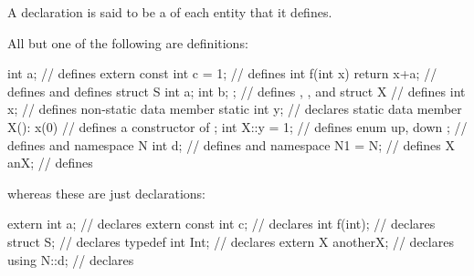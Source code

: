 A declaration is said to be a  of each entity that it defines.
\begin{example} All but one of the following are definitions:
\begin{codeblock}
int a;                          // defines 
extern const int c = 1;         // defines 
int f(int x) { return x+a; }    // defines  and defines 
struct S { int a; int b; };     // defines , , and 
struct X {                      // defines 
  int x;                        // defines non-static data member 
  static int y;                 // declares static data member 
  X(): x(0) { }                 // defines a constructor of 
};
int X::y = 1;                   // defines 
enum { up, down };              // defines  and 
namespace N { int d; }          // defines  and 
namespace N1 = N;               // defines 
X anX;                          // defines 

\end{codeblock}
whereas these are just declarations:
\begin{codeblock}
extern int a;                   // declares 
extern const int c;             // declares 
int f(int);                     // declares 
struct S;                       // declares 
typedef int Int;                // declares 
extern X anotherX;              // declares 
using N::d;                     // declares 
\end{codeblock}
\end{example}

